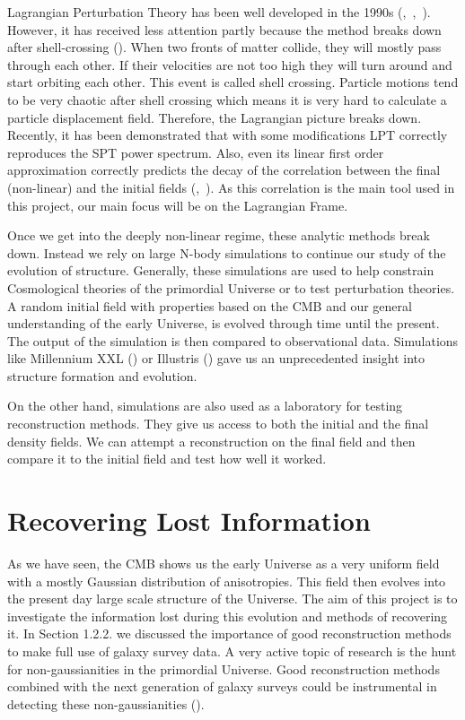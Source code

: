 Lagrangian Perturbation Theory has been well developed in the 1990s (\cite{1992MNRAS.254..729B},~\cite{1993MNRAS.264..375B},~\cite{1994MNRAS.267..811B}). However, it has received less attention partly because the method breaks down after shell-crossing (\cite{Carlson_perturbation_theory}).
When two fronts of matter collide, they will mostly pass through each other. If their velocities are not too high they will turn around and start orbiting each other. This event is called shell crossing. Particle motions tend to be very chaotic after shell crossing which means it is very hard to calculate a particle displacement field. Therefore, the Lagrangian picture breaks down. Recently, it has been demonstrated that with some modifications LPT correctly reproduces the SPT power spectrum. Also, even its linear first order approximation correctly predicts the decay of the correlation between the final (non-linear) and the initial fields (\cite{2008PhRvD..77f3530M},~\cite{2008PhRvD..78h3519M}). As this correlation is the main tool used in this project, our main focus will be on the Lagrangian Frame. 

Once we get into the deeply non-linear regime, these analytic methods break down. Instead we rely on large N-body simulations to continue our study of the evolution of structure. Generally, these simulations are used to help constrain Cosmological theories of the primordial Universe or to test perturbation theories. A random initial field with properties based on the CMB and our general understanding of the early Universe, is evolved through time until the present. The output of the simulation is then compared to observational data. Simulations like Millennium XXL (\cite{Millennium_XXL}) or Illustris (\cite{Illustris_sim}) gave us an unprecedented insight into structure formation and evolution.

On the other hand, simulations are also used as a laboratory for testing reconstruction methods. They give us access to both the initial and the final density fields. We can attempt a reconstruction on the final field and then compare it to the initial field and test how well it worked. 

\section{Recovering Lost Information}

As we have seen, the CMB shows us the early Universe as a very uniform field with a mostly Gaussian distribution of anisotropies. This field then evolves into the present day large scale structure of the Universe. The aim of this project is to investigate the information lost during this evolution and methods of recovering it. In Section 1.2.2. we discussed the importance of good reconstruction methods to make full use of galaxy survey data. A very active topic of research is the hunt for non-gaussianities in the primordial Universe. Good reconstruction methods combined with the next generation of galaxy surveys could be instrumental in detecting these non-gaussianities (\cite{2004PhR...402..103B}).


